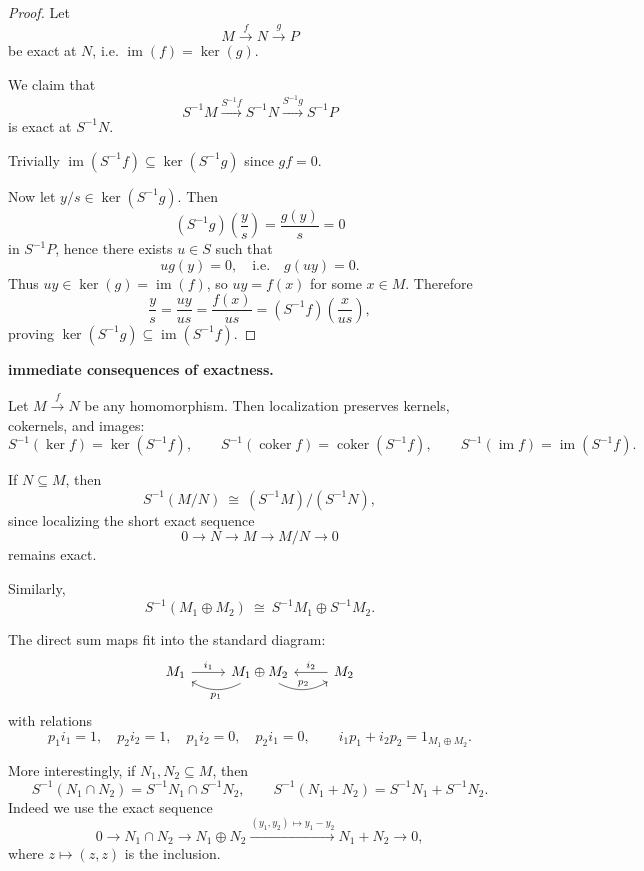 \documentclass[11pt,a4paper]{article}
\theoremstyle{definition}
\theoremstyle{plain}
\theoremstyle{remark}
\newcommand{\im}{\operatorname{im}}
\newcommand{\coker}{\operatorname{coker}}
\begin{document}
\begin{proof}
    Let
    \[
    M\xrightarrow{f}N\xrightarrow{g}P
    \]
    be exact at $N$, i.e. $\im(f)=\ker(g)$.

    We claim that
    \[
    S^{-1}M\xrightarrow{S^{-1}f}S^{-1}N\xrightarrow{S^{-1}g}S^{-1}P
    \]
    is exact at $S^{-1}N$.

    Trivially $\im(S^{-1}f)\subseteq\ker(S^{-1}g)$ since $gf=0$.

    Now let $y/s\in\ker(S^{-1}g)$. Then
    \[
    (S^{-1}g)\!\left(\frac{y}{s}\right)=\frac{g(y)}{s}=0
    \]
    in $S^{-1}P$, hence there exists $u\in S$ such that
    \[
    ug(y)=0,
    \quad\text{i.e.}\quad g(uy)=0.
    \]
    Thus $uy\in\ker(g)=\im(f)$, so $uy=f(x)$ for some $x\in M$. Therefore
    \[
    \frac{y}{s}
    =
    \frac{uy}{us}
    =
    \frac{f(x)}{us}
    =
    (S^{-1}f)\!\left(\frac{x}{us}\right),
    \]
    proving $\ker(S^{-1}g)\subseteq\im(S^{-1}f)$.
\end{proof}

\textbf{immediate consequences of exactness.}

Let $M\xrightarrow{f}N$ be any homomorphism. Then localization preserves kernels, cokernels, and images:
\[
S^{-1}(\ker f)=\ker(S^{-1}f),
\qquad 
S^{-1}(\coker f)=\coker(S^{-1}f),
\qquad 
S^{-1}(\im f)=\im(S^{-1}f).
\]

If $N\subseteq M$, then
\[
S^{-1}(M/N)\ \cong\ (S^{-1}M)/(S^{-1}N),
\]
since localizing the short exact sequence
\[
0\to N\to M\to M/N\to 0
\]
remains exact.

Similarly,
\[
S^{-1}(M_1\oplus M_2)\ \cong\ S^{-1}M_1\oplus S^{-1}M_2.
\]

The direct sum maps fit into the standard diagram:
\[
\begin{tikzcd}
M_1 \arrow[r,"i_1"] & M_1\oplus M_2 \arrow[r, bend right=30, "p_2"] \arrow[l,bend left=30,"p_1"]
& M_2 \arrow[l,"i_2"']
\end{tikzcd}
\]
with relations
\[
p_1i_1=1,\quad p_2i_2=1,\quad p_1i_2=0,\quad p_2i_1=0,
\qquad 
i_1p_1+i_2p_2=1_{M_1\oplus M_2}.
\]

More interestingly, if $N_1,N_2\subseteq M$, then
\[
S^{-1}(N_1\cap N_2)=S^{-1}N_1\cap S^{-1}N_2,
\qquad 
S^{-1}(N_1+N_2)=S^{-1}N_1+S^{-1}N_2.
\]
Indeed we use the exact sequence
\[
0\to N_1\cap N_2\to N_1\oplus N_2
\xrightarrow{(y_1,y_2)\mapsto y_1-y_2}
N_1+N_2\to 0,
\]
where $z\mapsto(z,z)$ is the inclusion.
\end{document}

